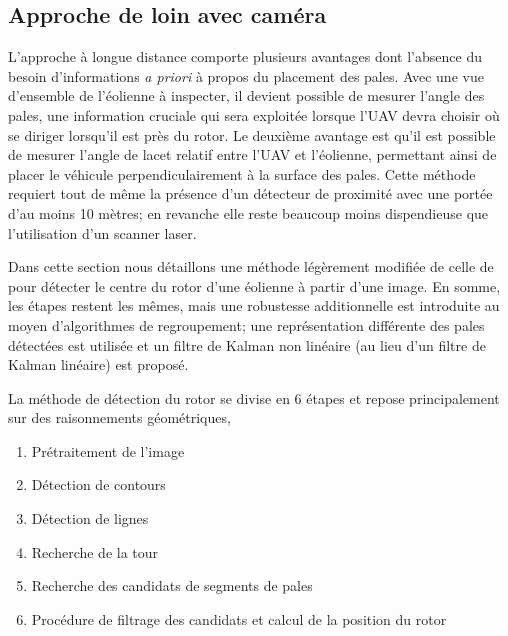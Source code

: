 \subsection{Approche de loin avec caméra}
\label{subsec:approche_loin}

L'approche à longue distance comporte plusieurs avantages dont l'absence du besoin d'informations \textit{a priori} à propos du placement des pales. Avec une vue d'ensemble de l'éolienne à inspecter, il devient possible de mesurer l'angle des pales, une information cruciale qui sera exploitée lorsque l'UAV devra choisir où se diriger lorsqu'il est près du rotor. Le deuxième avantage est qu'il est possible de mesurer l'angle de lacet relatif entre l'UAV et l'éolienne, permettant ainsi de placer le véhicule perpendiculairement à la surface des pales. Cette méthode requiert tout de même la présence d'un détecteur de proximité avec une portée d'au moins 10 mètres; en revanche elle reste beaucoup moins dispendieuse que l'utilisation d'un scanner laser.

Dans cette section nous détaillons une méthode légèrement modifiée de celle de \citep{Stokkeland2015} pour détecter le centre du rotor d'une éolienne à partir d'une image. En somme, les étapes restent les mêmes, mais une robustesse additionnelle est introduite au moyen d'algorithmes de regroupement; une représentation différente des pales détectées est utilisée et un filtre de Kalman non linéaire (au lieu d'un filtre de Kalman linéaire) est proposé.

La méthode de détection du rotor se divise en 6 étapes et repose principalement sur des raisonnements géométriques,

\begin{enumerate}
  \item Prétraitement de l'image
  \item Détection de contours
  \item Détection de lignes
  \item Recherche de la tour
  \item Recherche des candidats de segments de pales
  \item Procédure de filtrage des candidats et calcul de la position du rotor
\end{enumerate}

